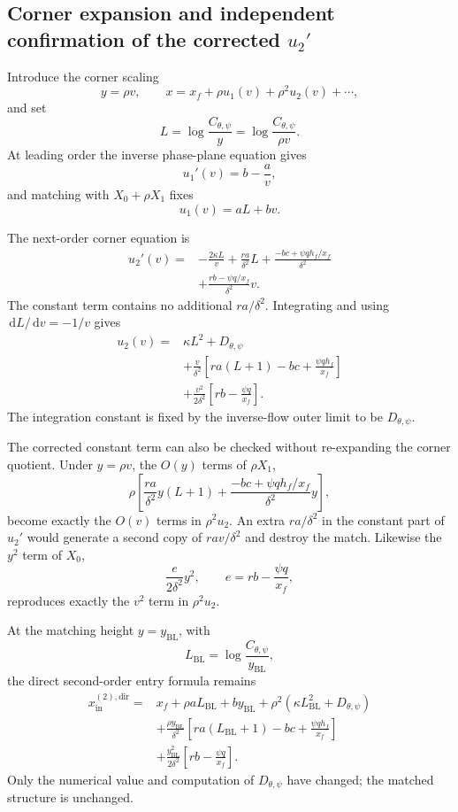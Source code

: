 \documentclass[11pt]{article}
\newcommand{\xf}{x_f}
\newcommand{\yin}{y_{\mathrm{BL}}}
\newcommand{\xin}{x_{\mathrm{in}}}
\newcommand{\dd}{\,\mathrm{d}}
\begin{document}
\subsection{Corner expansion and independent confirmation of the corrected \texorpdfstring{\(u_2'\)}{u2'}}
Introduce the corner scaling
\[
y=\rho v,
\qquad
x=\xf+\rho u_1(v)+\rho^2u_2(v)+\cdots,
\]
and set
\[
L=\log\frac{C_{\theta,\psi}}{y}
=\log\frac{C_{\theta,\psi}}{\rho v}.
\]
At leading order the inverse phase-plane equation gives
\[
u_1'(v)=b-\frac av,
\]
and matching with \(X_0+\rho X_1\) fixes
\[
\boxed{u_1(v)=aL+bv}.
\]

The next-order corner equation is
\[
\boxed{
\begin{aligned}
u_2'(v)={}&
-\frac{2\kappa L}{v}
+\frac{ra}{\delta^2}L
+\frac{-bc+\psi qh_f/\xf}{\delta^2}\\
&+\frac{rb-\psi q/\xf}{\delta^2}v.
\end{aligned}}
\]
The constant term contains no additional \(ra/\delta^2\).  Integrating and using \(\dd L/\dd v=-1/v\) gives
\[
\boxed{
\begin{aligned}
u_2(v)={}&
\kappa L^2+D_{\theta,\psi}\\
&+\frac{v}{\delta^2}
\left[ra(L+1)-bc+\frac{\psi qh_f}{\xf}\right]\\
&+\frac{v^2}{2\delta^2}
\left[rb-\frac{\psi q}{\xf}\right].
\end{aligned}}
\]
The integration constant is fixed by the inverse-flow outer limit to be \(D_{\theta,\psi}\).

The corrected constant term can also be checked without re-expanding the corner quotient.  Under \(y=\rho v\), the \(O(y)\) terms of \(\rho X_1\),
\[
\rho\left[
\frac{ra}{\delta^2}y(L+1)
+\frac{-bc+\psi qh_f/\xf}{\delta^2}y
\right],
\]
become exactly the \(O(v)\) terms in \(\rho^2u_2\).  An extra \(ra/\delta^2\) in the constant part of \(u_2'\) would generate a second copy of \(rav/\delta^2\) and destroy the match.  Likewise the \(y^2\) term of \(X_0\),
\[
\frac{e}{2\delta^2}y^2,
\qquad
e=rb-\frac{\psi q}{\xf},
\]
reproduces exactly the \(v^2\) term in \(\rho^2u_2\).

At the matching height \(y=\yin\), with
\[
L_{\mathrm{BL}}=\log\frac{C_{\theta,\psi}}{\yin},
\]
the direct second-order entry formula remains
\[
\begin{aligned}
\xin^{(2),\mathrm{dir}}={}&\xf+\rho aL_{\mathrm{BL}}+b\yin
+\rho^2\left(\kappa L_{\mathrm{BL}}^2+D_{\theta,\psi}\right)\\
&+\frac{\rho\yin}{\delta^2}
\left[ra(L_{\mathrm{BL}}+1)-bc+\frac{\psi qh_f}{\xf}\right]\\
&+\frac{\yin^2}{2\delta^2}
\left[rb-\frac{\psi q}{\xf}\right].
\end{aligned}
\]
Only the numerical value and computation of \(D_{\theta,\psi}\) have changed; the matched structure is unchanged.
\end{document}
